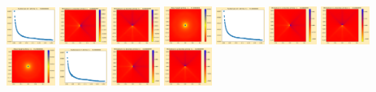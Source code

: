 \documentclass[11pt]{article}
\begin{document}
\includegraphics[width=0.11875\textwidth]{frame0090fig1.png}
\includegraphics[width=0.11875\textwidth]{frame0090fig2.png}
\includegraphics[width=0.11875\textwidth]{frame0090fig3.png}
\includegraphics[width=0.11875\textwidth]{frame0091fig0.png}
\includegraphics[width=0.11875\textwidth]{frame0091fig1.png}
\includegraphics[width=0.11875\textwidth]{frame0091fig2.png}
\includegraphics[width=0.11875\textwidth]{frame0091fig3.png}
\vskip 10pt 
\includegraphics[width=0.11875\textwidth]{frame0092fig0.png}
\includegraphics[width=0.11875\textwidth]{frame0092fig1.png}
\includegraphics[width=0.11875\textwidth]{frame0092fig2.png}
\includegraphics[width=0.11875\textwidth]{frame0092fig3.png}
\end{document}
